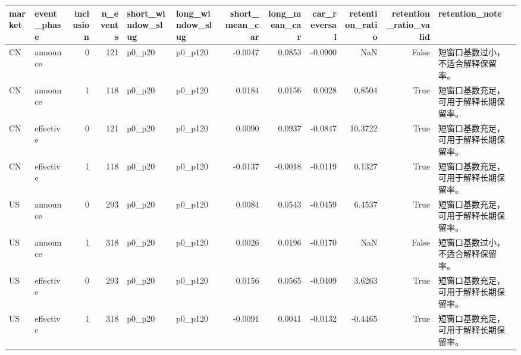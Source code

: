 \begin{tabular}{llrrllrrrrrl}
\toprule
market & event_phase & inclusion & n_events & short_window_slug & long_window_slug & short_mean_car & long_mean_car & car_reversal & retention_ratio & retention_ratio_valid & retention_note \\
\midrule
CN & announce & 0 & 121 & p0_p20 & p0_p120 & -0.0047 & 0.0853 & -0.0900 & NaN & False & 短窗口基数过小，不适合解释保留率。 \\
CN & announce & 1 & 118 & p0_p20 & p0_p120 & 0.0184 & 0.0156 & 0.0028 & 0.8504 & True & 短窗口基数充足，可用于解释长期保留率。 \\
CN & effective & 0 & 121 & p0_p20 & p0_p120 & 0.0090 & 0.0937 & -0.0847 & 10.3722 & True & 短窗口基数充足，可用于解释长期保留率。 \\
CN & effective & 1 & 118 & p0_p20 & p0_p120 & -0.0137 & -0.0018 & -0.0119 & 0.1327 & True & 短窗口基数充足，可用于解释长期保留率。 \\
US & announce & 0 & 293 & p0_p20 & p0_p120 & 0.0084 & 0.0543 & -0.0459 & 6.4537 & True & 短窗口基数充足，可用于解释长期保留率。 \\
US & announce & 1 & 318 & p0_p20 & p0_p120 & 0.0026 & 0.0196 & -0.0170 & NaN & False & 短窗口基数过小，不适合解释保留率。 \\
US & effective & 0 & 293 & p0_p20 & p0_p120 & 0.0156 & 0.0565 & -0.0409 & 3.6263 & True & 短窗口基数充足，可用于解释长期保留率。 \\
US & effective & 1 & 318 & p0_p20 & p0_p120 & -0.0091 & 0.0041 & -0.0132 & -0.4465 & True & 短窗口基数充足，可用于解释长期保留率。 \\
\bottomrule
\end{tabular}
